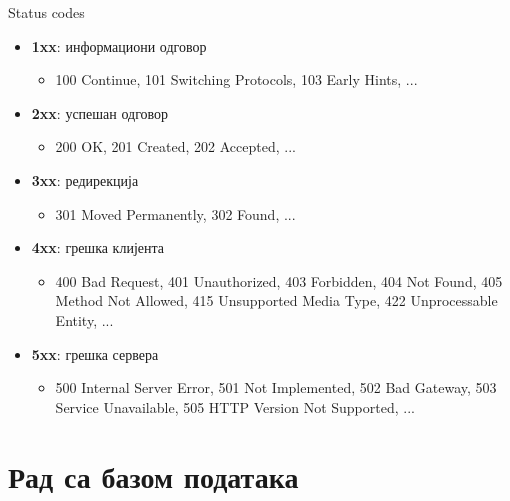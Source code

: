 \documentclass[aspectratio=169]{beamer}
\begin{document}
    \begin{frame}{Status codes}
        \begin{itemize}
            \item \textbf{1xx}: информациони одговор
            \begin{itemize}
                \item 100 Continue, 101 Switching Protocols, 103 Early Hints, ...
            \end{itemize}
            \item \textbf{2xx}: успешан одговор
            \begin{itemize}
                \item 200 OK, 201 Created, 202 Accepted, ...
            \end{itemize}
            \item \textbf{3xx}: редирекција
            \begin{itemize}
                \item 301 Moved Permanently, 302 Found, ...
            \end{itemize}
            \item \textbf{4xx}: грешка клијента
            \begin{itemize}
                \item 400 Bad Request, 401 Unauthorized, 403 Forbidden, 404 Not Found, 405 Method Not Allowed, 415 Unsupported Media Type, 422 Unprocessable Entity, ...
            \end{itemize}
            \item \textbf{5xx}: грешка сервера
            \begin{itemize}
                \item 500 Internal Server Error, 501 Not Implemented, 502 Bad Gateway, 503 Service Unavailable, 505 HTTP Version Not Supported, ...
            \end{itemize}
        \end{itemize}
    \end{frame}
    
    \section{Рад са базом података}
    
\end{document}
